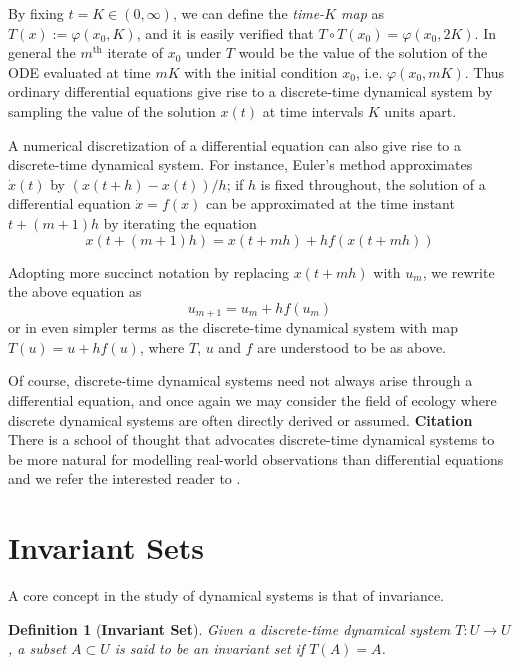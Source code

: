 \documentclass[a4paper,12pt,twoside]{report}
\newtheorem{Definition}{Definition}[]
\begin{document}
By fixing $t=K \in (0,\infty)$, we can define the \emph{time-$K$ map} as  $T(x):= \varphi(x_0,K)$, and it is easily verified that $T\circ T(x_0) = \varphi(x_0,2K)$. In general the $m^{\mbox{th}}$ iterate of $x_0$ under $T$ would be the value of the solution of the ODE evaluated at time $mK$ with the initial condition $x_0$, i.e. $\varphi(x_0, mK)$. 
Thus ordinary differential equations give rise to a discrete-time dynamical system by sampling the value of the solution $x(t)$ at time intervals $K$ units apart. 


A numerical discretization of a differential equation can also give rise to a discrete-time dynamical system. For instance, Euler's method approximates $\dot{x}(t)$ by $(x(t+h)-x(t))/h$; if $h$ is fixed throughout, the solution of a differential equation $\dot{x}=f(x)$ 
can be approximated at the time instant $t+(m+1)h$ by iterating the equation 
\begin{equation}
  x(t+(m+1)h) = x(t+mh) + h f(x(t+mh))
\end{equation}

Adopting more succinct notation by replacing $x(t+mh)$ with $u_m$, we rewrite the above equation as
\begin{equation}
u_{m+1} = u_m + hf(u_m)
\end{equation}
or in even simpler terms as the discrete-time dynamical system with map $T(u) = u + hf(u)$, where $T$, $u$ and $f$ are understood to be as above.


Of course, discrete-time dynamical systems need not always arise through a differential equation, and once again we may consider the field of ecology where discrete dynamical systems are often directly derived or assumed. \textbf{Citation}
There is a school of thought that advocates discrete-time dynamical systems to be more natural for modelling real-world observations than differential equations and we refer the interested reader to \cite{saber2010introduction}.


\section{Invariant Sets}

A core concept in the study of dynamical systems is that of invariance. 
\begin{Definition}
  [\bf Invariant Set]\label{Dfn_InvariantSet}\rm
  Given a discrete-time dynamical system $T: U \to U$, a subset $A \subset U$ is said to be an \emph{invariant set} if $T(A) =A$. 
\end{Definition}
\end{document}
